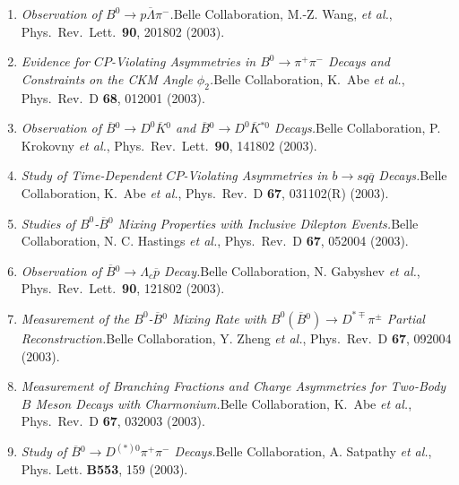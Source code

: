 \documentclass[10pt,a4paper]{article}
\def\pub#1#2#3{{\it #1.}\newline #2, #3.}
\def\PLB#1{Phys. Lett. {\bf B#1}}
\def\PRL{Phys.\ Rev.\ Lett.\ }
\def\PRD{Phys.\ Rev.\ D }
\def\etal{{\it et al.}}
\def\belle{Belle Collaboration, K.~Abe \etal }
\begin{document}
\begin{enumerate}
\item
\pub{Observation of $B^{0} \to p \overline{\Lambda} \pi^{-}$}
{Belle Collaboration, M.-Z. Wang, \etal}
{\PRL {\bf 90}, 201802 (2003)}
    
\item
\pub{Evidence for $CP$-Violating Asymmetries in $B^0 \to \pi^+\pi^-$
Decays and Constraints on the CKM Angle $\phi_2$} 
{\belle}
{\PRD {\bf 68}, 012001 (2003)}

\item
\pub{Observation of $\overline{B}{}^0 \to D^0 \overline{K}{}^0$ and
$\overline{B}{}^0 \to D^0 \overline{K}{}^{*0}$ Decays}
{Belle Collaboration, P. Krokovny \etal}
{\PRL {\bf 90}, 141802 (2003)}

\item
\pub{Study of Time-Dependent $CP$-Violating Asymmetries in $b \to s q
\overline{q}$ Decays}
{\belle}
{\PRD {\bf 67}, 031102(R) (2003)}

\item
\pub{Studies of $B^0$-$\overline{B}{}^0$ Mixing Properties with
Inclusive Dilepton Events}
{Belle Collaboration, N. C. Hastings \etal}
{\PRD {\bf 67}, 052004 (2003)}

\item
\pub{Observation of $\overline{B}{}^0 \to \Lambda_c \overline{p}$ Decay}
{Belle Collaboration, N. Gabyshev \etal}
{\PRL {\bf 90}, 121802 (2003)}

\item
\pub{Measurement of the $B^0$-$\overline{B}{}^0$ Mixing Rate with
$B^0(\overline{B}{}^0) \to D^{*\mp} \pi^{\pm}$ Partial Reconstruction}
{Belle Collaboration, Y. Zheng \etal}
{\PRD {\bf 67}, 092004 (2003)}

\item
\pub{Measurement of Branching Fractions and Charge Asymmetries for
Two-Body $B$ Meson Decays with Charmonium}
{\belle}
{\PRD {\bf 67}, 032003 (2003)}

\item
\pub{Study of $\overline{B}{}^0 \to D^{(*)0} \pi^+ \pi^-$ Decays}
{Belle Collaboration, A. Satpathy \etal}
{\PLB{553}, 159 (2003)}


\end{enumerate}
\end{document}
